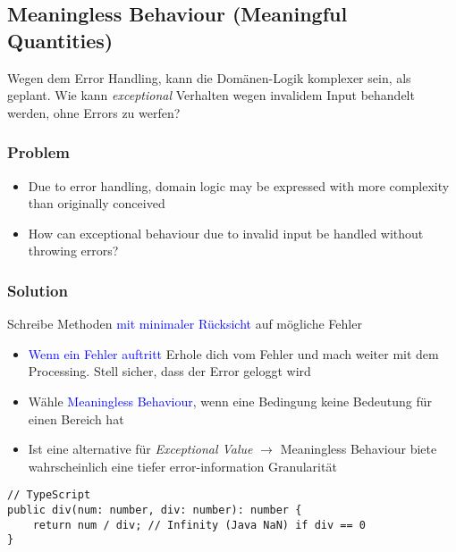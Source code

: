 \subsection{Meaningless Behaviour (Meaningful Quantities)}

Wegen dem Error Handling, kann die Domänen-Logik komplexer sein, als geplant. Wie kann \textit{exceptional} Verhalten wegen invalidem Input behandelt werden, ohne Errors zu werfen?

\subsubsection{Problem}
\begin{itemize}
    \item Due to error handling, domain logic may be expressed with more complexity than originally conceived
    \item How can exceptional behaviour due to invalid input be handled without throwing errors?
\end{itemize}

\subsubsection{Solution}
Schreibe Methoden \textcolor{blue}{mit minimaler Rücksicht} auf mögliche Fehler
\begin{itemize}
    \item \textcolor{blue}{Wenn ein Fehler auftritt} Erhole dich vom Fehler und mach weiter mit dem Processing. Stell sicher, dass der Error geloggt wird
    \item Wähle \textcolor{blue}{Meaningless Behaviour}, wenn eine Bedingung keine Bedeutung für einen Bereich hat
    \item Ist eine alternative für \textit{Exceptional Value} $\rightarrow$ Meaningless Behaviour biete wahrscheinlich eine tiefer error-information Granularität
\end{itemize}
\begin{lstlisting}
// TypeScript
public div(num: number, div: number): number {
    return num / div; // Infinity (Java NaN) if div == 0
}
\end{lstlisting}
